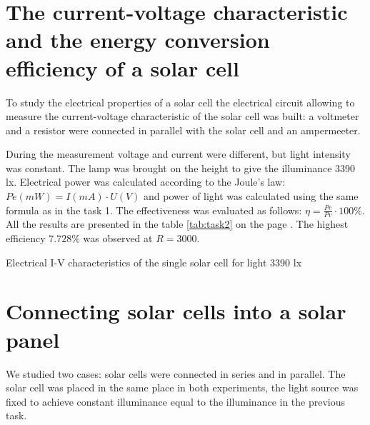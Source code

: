 \documentclass[12pt, letterpaper]{article}
\begin{document}
\newpage
\section{The current-voltage characteristic and the energy conversion efficiency of a solar cell}
To study the electrical properties of a solar cell the electrical circuit allowing to measure the current-voltage characteristic of the solar cell was built: a voltmeter and a resistor were connected in parallel with the solar cell and an ampermeeter.
\par
During the measurement voltage and current were different, but light intensity was constant. The lamp was brought on the height to give the illuminance 3390 lx. Electrical power was calculated
according to the Joule's law: $Pe (mW) = I(mA) \cdot U(V)$ and power of light was calculated using the same formula as in the task 1. The effectiveness was evaluated as follows: $\eta = \frac{Pe}{Pv} \cdot 100 \%$. All the results are presented in the table \ref{tab:task2} on the page \pageref{tab:task2}. The highest efficiency $7.728\%$ was observed at $R = 3000$.

\begin{table}[htb]
\centering
{}
\caption{Electrical I-V characteristics of the single solar cell for light 3390 lx}
\label{tab:task2}
\end{table}
\newpage
\section{Connecting solar cells into a solar panel}
We studied two cases: solar cells were connected in series and in parallel. The solar cell was placed in the same place in both experiments, the light source was fixed to achieve constant illuminance equal to the illuminance in the previous task.
\end{document}
